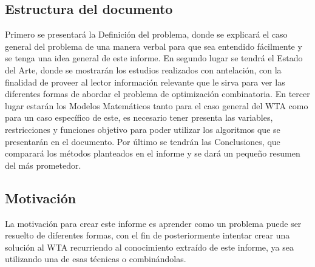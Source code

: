 \subsection{Estructura del documento}
Primero se presentará la Definición del problema, donde se explicará el caso general del problema de una manera verbal para que sea entendido fácilmente y se tenga una idea general de este informe. En segundo lugar se tendrá el Estado del Arte, donde se mostrarán los estudios realizados con antelación, con la finalidad de proveer al lector información relevante que le sirva para ver las diferentes formas de abordar el problema de optimización combinatoria.
En tercer lugar estarán los Modelos Matemáticos tanto para el caso general del WTA como para un caso específico de este, es necesario tener presenta las variables, restricciones y funciones objetivo para poder utilizar los algoritmos que se presentarán en el documento. Por último se tendrán las Conclusiones, que comparará los métodos planteados en el informe y se dará un pequeño resumen del más prometedor. 

\subsection{Motivación}
La motivación para crear este informe es aprender como un problema puede ser resuelto de diferentes formas, con el fin de posteriormente intentar crear una solución al WTA recurriendo al conocimiento extraído de este informe, ya sea utilizando una de esas técnicas o combinándolas.
